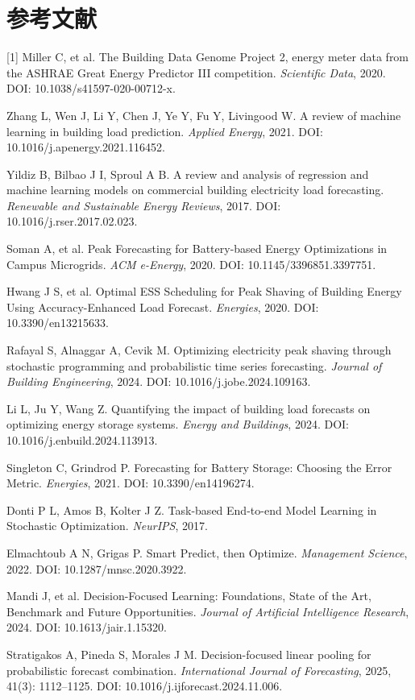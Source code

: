 \documentclass[12pt,a4paper]{article}
\begin{document}
\section{参考文献}
[1] Miller C, et al. The Building Data Genome Project 2, energy meter data from the ASHRAE Great Energy Predictor III competition. \textit{Scientific Data}, 2020. DOI: 10.1038/s41597-020-00712-x.\par
[2] Zhang L, Wen J, Li Y, Chen J, Ye Y, Fu Y, Livingood W. A review of machine learning in building load prediction. \textit{Applied Energy}, 2021. DOI: 10.1016/j.apenergy.2021.116452.\par
[3] Yildiz B, Bilbao J I, Sproul A B. A review and analysis of regression and machine learning models on commercial building electricity load forecasting. \textit{Renewable and Sustainable Energy Reviews}, 2017. DOI: 10.1016/j.rser.2017.02.023.\par
[4] Soman A, et al. Peak Forecasting for Battery-based Energy Optimizations in Campus Microgrids. \textit{ACM e-Energy}, 2020. DOI: 10.1145/3396851.3397751.\par
[5] Hwang J S, et al. Optimal ESS Scheduling for Peak Shaving of Building Energy Using Accuracy-Enhanced Load Forecast. \textit{Energies}, 2020. DOI: 10.3390/en13215633.\par
[6] Rafayal S, Alnaggar A, Cevik M. Optimizing electricity peak shaving through stochastic programming and probabilistic time series forecasting. \textit{Journal of Building Engineering}, 2024. DOI: 10.1016/j.jobe.2024.109163.\par
[7] Li L, Ju Y, Wang Z. Quantifying the impact of building load forecasts on optimizing energy storage systems. \textit{Energy and Buildings}, 2024. DOI: 10.1016/j.enbuild.2024.113913.\par
[8] Singleton C, Grindrod P. Forecasting for Battery Storage: Choosing the Error Metric. \textit{Energies}, 2021. DOI: 10.3390/en14196274.\par
[9] Donti P L, Amos B, Kolter J Z. Task-based End-to-end Model Learning in Stochastic Optimization. \textit{NeurIPS}, 2017.\par
[10] Elmachtoub A N, Grigas P. Smart Predict, then Optimize. \textit{Management Science}, 2022. DOI: 10.1287/mnsc.2020.3922.\par
[11] Mandi J, et al. Decision-Focused Learning: Foundations, State of the Art, Benchmark and Future Opportunities. \textit{Journal of Artificial Intelligence Research}, 2024. DOI: 10.1613/jair.1.15320.\par
[12] Stratigakos A, Pineda S, Morales J M. Decision-focused linear pooling for probabilistic forecast combination. \textit{International Journal of Forecasting}, 2025, 41(3): 1112–1125. DOI: 10.1016/j.ijforecast.2024.11.006.\par
\end{document}
